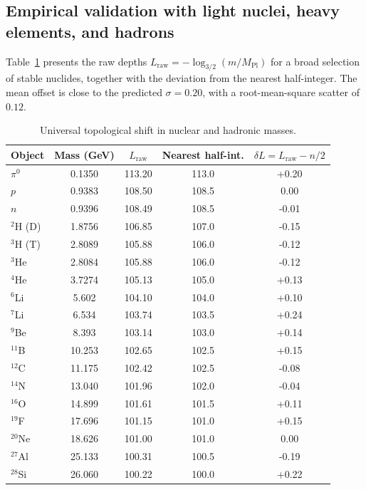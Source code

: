 \documentclass[12pt,a4paper]{article}
\begin{document}
	\subsection{Empirical validation with light nuclei, heavy elements, and hadrons}
	Table~\ref{tab:nuclear_sigma} presents the raw depths \(L_{\mathrm{raw}} = -\log_{3/2}(m/M_{\mathrm{Pl}})\) for a broad selection of stable nuclides, together with the deviation from the nearest half-integer.  
	The mean offset is close to the predicted \(\sigma = 0.20\), with a root-mean-square scatter of \(0.12\).
	
	\begin{table}[htbp]
		\centering
		\caption{Universal topological shift in nuclear and hadronic masses.}
		\label{tab:nuclear_sigma}
		\small
		\begin{tabular}{l c c c c}
			\toprule
			Object & Mass (GeV) & \(L_{\mathrm{raw}}\) & Nearest half-int. & \(\delta L = L_{\mathrm{raw}} - n/2\) \\
			\midrule
			\(\pi^0\) & 0.1350 & 113.20 & 113.0 & +0.20 \\
			\(p\)     & 0.9383 & 108.50 & 108.5 & 0.00  \\
			\(n\)     & 0.9396 & 108.49 & 108.5 & -0.01 \\
			\(^2\)H (D) & 1.8756 & 106.85 & 107.0 & -0.15 \\
			\(^3\)H (T) & 2.8089 & 105.88 & 106.0 & -0.12 \\
			\(^3\)He & 2.8084 & 105.88 & 106.0 & -0.12 \\
			\(^4\)He & 3.7274 & 105.13 & 105.0 & +0.13 \\
			\(^6\)Li & 5.602  & 104.10 & 104.0 & +0.10 \\
			\(^7\)Li & 6.534  & 103.74 & 103.5 & +0.24 \\
			\(^9\)Be & 8.393  & 103.14 & 103.0 & +0.14 \\
			\(^{11}\)B & 10.253 & 102.65 & 102.5 & +0.15 \\
			\(^{12}\)C & 11.175 & 102.42 & 102.5 & -0.08 \\
			\(^{14}\)N & 13.040 & 101.96 & 102.0 & -0.04 \\
			\(^{16}\)O & 14.899 & 101.61 & 101.5 & +0.11 \\
			\(^{19}\)F & 17.696 & 101.15 & 101.0 & +0.15 \\
			\(^{20}\)Ne & 18.626 & 101.00 & 101.0 & 0.00  \\
			\(^{27}\)Al & 25.133 & 100.31 & 100.5 & -0.19 \\
			\(^{28}\)Si & 26.060 & 100.22 & 100.0 & +0.22 \\

\end{tabular}
\end{table}
\end{document}
